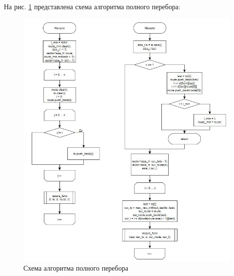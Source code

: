 \documentclass[12pt]{report}
\begin{document}
На рис. \ref{fig:def} представлена схема алгоритма полного перебора:
	\begin{figure}[h]
        	\begin{center}
        		\includegraphics[scale=0.79]{1}
        		\caption{Схема алгоритма полного перебора}
        		\label{fig:def}
        	\end{center}
        \end{figure}
\end{document}
